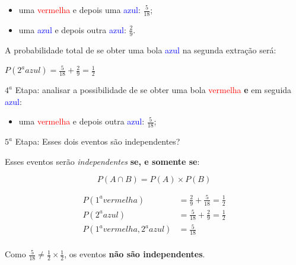 \documentclass[
]{book}
\providecommand{\tightlist}{%
  \setlength{\itemsep}{0pt}\setlength{\parskip}{0pt}}
\begin{document}
\hfill\break

\begin{itemize}
\tightlist
\item
  uma \textcolor{red}{vermelha} e depois uma \textcolor{blue}{azul}: \(\frac{5}{18}\);\\
\item
  uma \textcolor{blue}{azul} e depois outra \textcolor{blue}{azul}: \(\frac{2}{9}\).
\end{itemize}

\hfill\break

A probabilidade total de se obter uma bola \textcolor{blue}{azul} na segunda extração será:

\hfill\break

\(P(2^{a} azul)= \frac{5}{18} + \frac{2}{9} = \frac{1}{2}\)

\hfill\break

\(4^{a}\) Etapa: analisar a possibilidade de se obter uma bola \textcolor{red}{vermelha} \textbf{e} em seguida \textcolor{blue}{azul}:

\hfill\break

\begin{itemize}
\tightlist
\item
  uma \textcolor{red}{vermelha} e depois outra \textcolor{blue}{azul}: \(\frac{5}{18}\);
\end{itemize}

\hfill\break

\(5^{a}\) Etapa: Esses dois eventos são independentes?

\hfill\break

Esses eventos serão \emph{independentes} \textbf{se, e somente se}:

\hfill\break

\[
P (A \cap B)= P(A) \times P(B)
\]

\hfill\break

\begin{align*}
P(1^{a} vermelha) & = \frac{2}{9} + \frac{5}{18} = \frac{1}{2} \\
P(2^{a} azul) & = \frac{5}{18} + \frac{2}{9} = \frac{1}{2} \\
P(1^{a} vermelha,2^{a} azul) & = \frac{5}{18} \\
\end{align*}

\hfill\break

Como \(\frac{5}{18} \neq \frac{1}{2} \times \frac{1}{2}\), os eventos \textbf{não são independentes}.

\hfill\break
\end{document}
